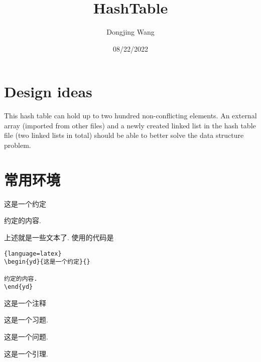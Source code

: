 \documentclass[a4,10pt]{ctexart}
\begin{document}
\title{HashTable}
\author{Dongjing Wang}
\date{08/22/2022}
\maketitle
\tableofcontents
\newpage
{}
\newpage



\section{Design ideas}

This hash table can hold up to two hundred non-conflicting elements. An external array (imported from other files) and a newly created linked list in the hash table file (two linked lists in total) should be able to better solve the data structure problem.

\section{常用环境}
\begin{yd}{这是一个约定}{}
              
约定的内容.
\end{yd}

上述就是一些文本了. 使用的代码是
\begin{lstlisting}{language=latex}
\begin{yd}{这是一个约定}{}
              
约定的内容.
\end{yd}
\end{lstlisting}

\begin{zs}
        
这是一个注释
    
\end{zs}
    
\begin{xt}
        
这是一个习题.
    
\end{xt}
    
\begin{lt}
        
这是一个问题.
    
\end{lt}

\begin{yl}
        
这是一个引理.
    
\end{yl}
\end{document}
